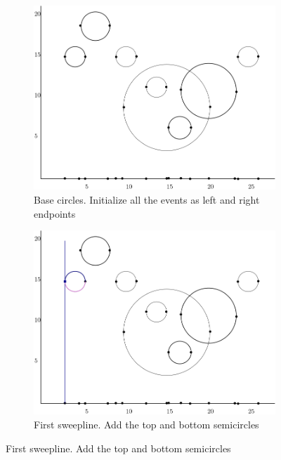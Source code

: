 \documentclass[11pt]{article}
\begin{document}
\begin{figure}[h!]
    \centering
    \begin{subfigure}[b]{0.45\textwidth}
        \centering
        \includegraphics[width=\textwidth]{base}
        \caption{Base circles. Initialize all the events as left and right endpoints}
        \label{fig:y equals x}
    \end{subfigure}
    \hfill
    \begin{subfigure}[b]{0.45\textwidth}
        \centering
        \includegraphics[width=\textwidth]{e1}
        \caption{First sweepline. Add the top and bottom semicircles}
        \label{fig:three sin x}
    \end{subfigure}

\end{figure}
\end{document}
